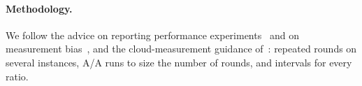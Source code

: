 \paragraph{Methodology.} We follow the advice on reporting performance experiments~\cite{hoefler2015scientific} and on
measurement bias~\cite{mytkowicz2009wrongdata}, and the cloud-measurement guidance of~\cite{leitner2016patterns,uta2020bigdata}:
repeated rounds on several instances, A/A runs to size the number of rounds, and intervals for every ratio.
